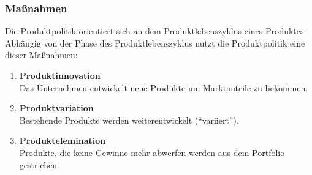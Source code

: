 \subsubsection{Maßnahmen}
\begin{flushleft}
    Die Produktpolitik orientiert sich an dem \hyperref[subsec:Produktlebenszyklus]{Produktlebenszyklus}
    eines Produktes. Abhängig von der Phase des Produktlebenszyklus nutzt die Produktpolitik eine dieser
    Maßnahmen:
    \begin{enumerate}
        \item {
            \textbf{Produktinnovation} \\
            Das Unternehmen entwickelt neue Produkte um Marktanteile zu bekommen.
        }
        \item {
            \textbf{Produktvariation} \\
            Bestehende Produkte werden weiterentwickelt (``variiert'').
        }
        \item {
            \textbf{Produktelemination} \\
            Produkte, die keine Gewinne mehr abwerfen werden aus dem Portfolio gestrichen.
        }
    \end{enumerate}
\end{flushleft}

